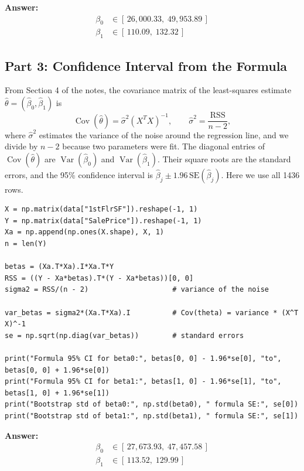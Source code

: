 \documentclass[11pt]{article}
\begin{document}
\textbf{Answer:}
\begin{align*}
  \beta_0 &\in [\,26{,}000.33,\; 49{,}953.89\,] \\
  \beta_1 &\in [\,110.09,\; 132.32\,]
\end{align*}

\subsection*{Part 3: Confidence Interval from the Formula}

From Section 4 of the notes, the covariance matrix of the least-squares estimate
$\hat\theta = (\hat\beta_0, \hat\beta_1)$ is
\[
  \operatorname{Cov}(\hat\theta) = \hat\sigma^2 (X^TX)^{-1},
  \qquad
  \hat\sigma^2 = \frac{\text{RSS}}{n-2},
\]
where $\hat\sigma^2$ estimates the variance of the noise around the regression line, and
we divide by $n-2$ because two parameters were fit. The diagonal entries of
$\operatorname{Cov}(\hat\theta)$ are $\operatorname{Var}(\hat\beta_0)$ and
$\operatorname{Var}(\hat\beta_1)$. Their square roots are the standard errors, and the 95\%
confidence interval is $\hat\beta_j \pm 1.96\,\text{SE}(\hat\beta_j)$. Here we use all
1436 rows.

\begin{lstlisting}
X = np.matrix(data["1stFlrSF"]).reshape(-1, 1)
Y = np.matrix(data["SalePrice"]).reshape(-1, 1)
Xa = np.append(np.ones(X.shape), X, 1)
n = len(Y)

betas = (Xa.T*Xa).I*Xa.T*Y
RSS = ((Y - Xa*betas).T*(Y - Xa*betas))[0, 0]
sigma2 = RSS/(n - 2)                    # variance of the noise

var_betas = sigma2*(Xa.T*Xa).I          # Cov(theta) = variance * (X^T X)^-1
se = np.sqrt(np.diag(var_betas))        # standard errors

print("Formula 95% CI for beta0:", betas[0, 0] - 1.96*se[0], "to", betas[0, 0] + 1.96*se[0])
print("Formula 95% CI for beta1:", betas[1, 0] - 1.96*se[1], "to", betas[1, 0] + 1.96*se[1])
print("Bootstrap std of beta0:", np.std(beta0), " formula SE:", se[0])
print("Bootstrap std of beta1:", np.std(beta1), " formula SE:", se[1])
\end{lstlisting}

\textbf{Answer:}
\begin{align*}
  \beta_0 &\in [\,27{,}673.93,\; 47{,}457.58\,] \\
  \beta_1 &\in [\,113.52,\; 129.99\,]
\end{align*}
\end{document}
